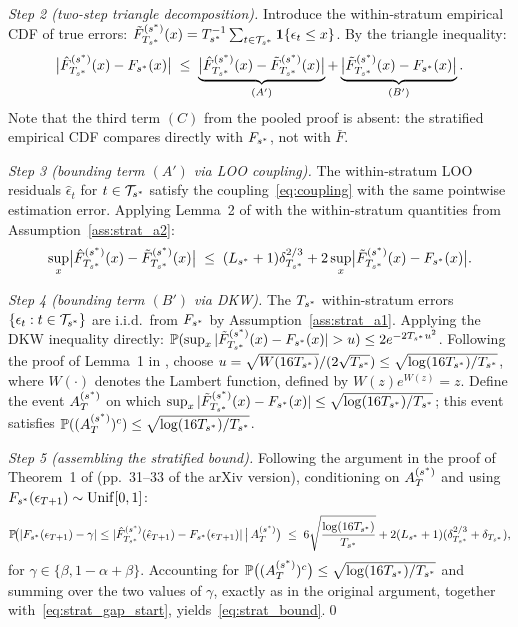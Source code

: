 \medskip
\noindent\textit{Step 2 (two-step triangle decomposition).}
Introduce the within-stratum empirical CDF of true errors:
$\tilde{F}_{T_{s^*}}^{(s^*)}(x)
= T_{s^*}^{-1}\sum_{t \in \mathcal{T}_{s^*}} \mathbf{1}\!\left\{\epsilon_t \leq x\right\}$.
By the triangle inequality:
\[
  \bigl|\hat{F}_{T_{s^*}}^{(s^*)}(x) - F_{s^*}(x)\bigr|
  \;\leq\;
  \underbrace{\bigl|\hat{F}_{T_{s^*}}^{(s^*)}(x) - \tilde{F}_{T_{s^*}}^{(s^*)}(x)\bigr|}_{(A')}
  +
  \underbrace{\bigl|\tilde{F}_{T_{s^*}}^{(s^*)}(x) - F_{s^*}(x)\bigr|}_{(B')}.
\]
Note that the third term $(C)$ from the pooled proof is absent:
the stratified empirical CDF compares directly with $F_{s^*}$,
not with $\bar{F}$.

\medskip
\noindent\textit{Step 3 (bounding term $(A')$ via LOO coupling).}
The within-stratum LOO residuals $\hat{\epsilon}_t$ for
$t \in \mathcal{T}_{s^*}$ satisfy the coupling~\eqref{eq:coupling}
with the same pointwise estimation error.  Applying Lemma~2 of
\citet{xu2023conformal} with the within-stratum quantities
from Assumption~\ref{ass:strat_a2}:
\[
  \sup_x\bigl|\hat{F}_{T_{s^*}}^{(s^*)}(x) - \tilde{F}_{T_{s^*}}^{(s^*)}(x)\bigr|
  \;\leq\;
  (L_{s^*}+1)\delta_{T_{s^*}}^{2/3}
  + 2\sup_x\bigl|\tilde{F}_{T_{s^*}}^{(s^*)}(x) - F_{s^*}(x)\bigr|.
\]

\medskip
\noindent\textit{Step 4 (bounding term $(B')$ via DKW).}
The $T_{s^*}$ within-stratum errors $\{\epsilon_t : t \in \mathcal{T}_{s^*}\}$
are i.i.d.\ from $F_{s^*}$ by Assumption~\ref{ass:strat_a1}.
Applying the DKW inequality \citep{massart1990tight} directly:
$\mathbb{P}(\sup_x|\tilde{F}_{T_{s^*}}^{(s^*)}(x)-F_{s^*}(x)| > u)
\leq 2e^{-2T_{s^*} u^2}$.
Following the proof of Lemma~1 in \citet{xu2023conformal}, choose
$u = \sqrt{W(16T_{s^*})}/(2\sqrt{T_{s^*}}) \leq \sqrt{\log(16T_{s^*})/T_{s^*}}$,
where $W(\cdot)$ denotes the Lambert function, defined by
$W(z)e^{W(z)} = z$.
Define the event $A_T^{(s^*)}$ on which
$\sup_x|\tilde{F}_{T_{s^*}}^{(s^*)}(x)-F_{s^*}(x)|
\leq \sqrt{\log(16T_{s^*})/T_{s^*}}$;
this event satisfies
$\mathbb{P}((A_T^{(s^*)})^c) \leq \sqrt{\log(16T_{s^*})/T_{s^*}}$.

\medskip
\noindent\textit{Step 5 (assembling the stratified bound).}
Following the argument in the proof of Theorem~1 of
\citet{xu2023conformal} (pp.~31--33 of the arXiv version),
conditioning on $A_T^{(s^*)}$ and using
$F_{s^*}(\epsilon_{T+1}) \sim \mathrm{Unif}[0,1]$:
\[
  \mathbb{P}\!\bigl(|F_{s^*}(\epsilon_{T+1}) - \gamma|
               \leq |\hat{F}_{T_{s^*}}^{(s^*)}(\hat{\epsilon}_{T+1})
                    - F_{s^*}(\epsilon_{T+1})|
        \,\big|\, A_T^{(s^*)}\bigr)
  \;\leq\;
  6\sqrt{\frac{\log(16T_{s^*})}{T_{s^*}}}
  + 2(L_{s^*}+1)(\delta_{T_{s^*}}^{2/3}+\delta_{T_{s^*}}),
\]
for $\gamma \in \{\beta, 1-\alpha+\beta\}$.  Accounting for
$\mathbb{P}\bigl((A_T^{(s^*)})^c\bigr) \leq \sqrt{\log(16T_{s^*})/T_{s^*}}$
and summing over the two values of $\gamma$, exactly as in the
original argument, together
with~\eqref{eq:strat_gap_start}, yields~\eqref{eq:strat_bound}.\qed

